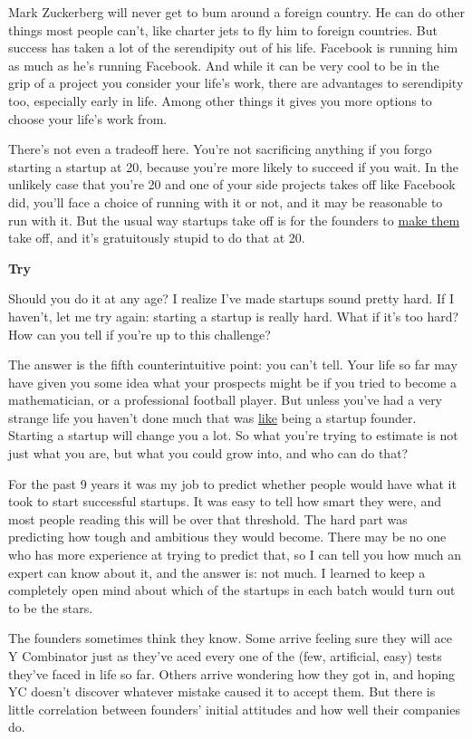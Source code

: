 Mark Zuckerberg will never get to bum around a foreign country. He can
do other things most people can't, like charter jets to fly him to
foreign countries. But success has taken a lot of the serendipity out of
his life. Facebook is running him as much as he's running Facebook. And
while it can be very cool to be in the grip of a project you consider
your life's work, there are advantages to serendipity too, especially
early in life. Among other things it gives you more options to choose
your life's work from.

There's not even a tradeoff here. You're not sacrificing anything if you
forgo starting a startup at 20, because you're more likely to succeed if
you wait. In the unlikely case that you're 20 and one of your side
projects takes off like Facebook did, you'll face a choice of running
with it or not, and it may be reasonable to run with it. But the usual
way startups take off is for the founders to \href{ds.html}{make them}
take off, and it's gratuitously stupid to do that at 20.

\textbf{Try}

Should you do it at any age? I realize I've made startups sound pretty
hard. If I haven't, let me try again: starting a startup is really hard.
What if it's too hard? How can you tell if you're up to this challenge?

The answer is the fifth counterintuitive point: you can't tell. Your
life so far may have given you some idea what your prospects might be if
you tried to become a mathematician, or a professional football player.
But unless you've had a very strange life you haven't done much that was
\href{really.html}{like} being a startup founder. Starting a startup
will change you a lot. So what you're trying to estimate is not just
what you are, but what you could grow into, and who can do that?

For the past 9 years it was my job to predict whether people would have
what it took to start successful startups. It was easy to tell how smart
they were, and most people reading this will be over that threshold. The
hard part was predicting how tough and ambitious they would become.
There may be no one who has more experience at trying to predict that,
so I can tell you how much an expert can know about it, and the answer
is: not much. I learned to keep a completely open mind about which of
the startups in each batch would turn out to be the stars.

The founders sometimes think they know. Some arrive feeling sure they
will ace Y Combinator just as they've aced every one of the (few,
artificial, easy) tests they've faced in life so far. Others arrive
wondering how they got in, and hoping YC doesn't discover whatever
mistake caused it to accept them. But there is little correlation
between founders' initial attitudes and how well their companies do.


